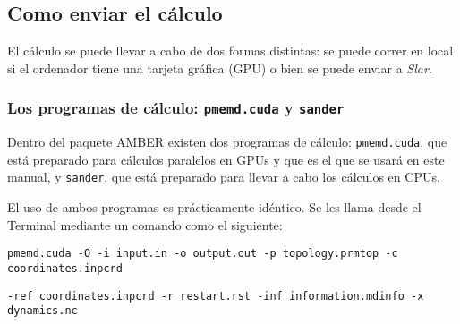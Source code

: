     \subsection{Como enviar el cálculo}
        El cálculo se puede llevar a cabo de dos formas distintas: se puede correr en local si el ordenador tiene una tarjeta gráfica (GPU) o bien se puede enviar a \textit{Slar}. 
        
        \subsubsection{Los programas de cálculo: \texttt{pmemd.cuda} y \texttt{sander}}
            Dentro del paquete AMBER existen dos programas de cálculo: \texttt{pmemd.cuda}, que está preparado para cálculos paralelos en GPUs y que es el que se usará en este manual, y \texttt{sander}, que está preparado para llevar a cabo los cálculos en CPUs.\par
            El uso de ambos programas es prácticamente idéntico. Se les llama desde el Terminal mediante un comando como el siguiente:
            
                \texttt{pmemd.cuda -O -i input.in -o output.out -p topology.prmtop -c coordinates.inpcrd}\par
                \texttt{\indent -ref coordinates.inpcrd -r restart.rst -inf information.mdinfo -x dynamics.nc  }
            

